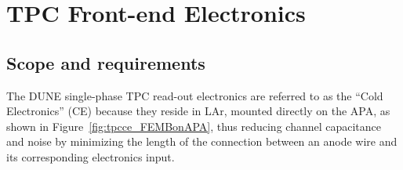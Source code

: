





\section{TPC Front-end Electronics}
\label{ch:ce}

%
\subsection{Scope and requirements}
\label{subsec:ce_intro}


The DUNE single-phase TPC read-out electronics are referred to as the ``Cold Electronics'' (CE) because they reside in LAr,
mounted directly on the APA, as shown in Figure~\ref{fig:tpcce_FEMBonAPA}, thus reducing channel capacitance and noise by minimizing the length of the connection between an anode wire
and its corresponding electronics input.

